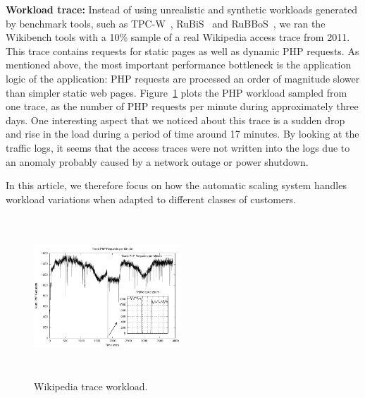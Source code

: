 

\textbf{Workload trace:}  Instead of using unrealistic and synthetic workloads generated by benchmark tools, such as TPC-W~\cite{TPC-W}, RuBiS~\cite{rubis} and RuBBoS~\cite{rubbos}, we ran the Wikibench tools with a 10\% sample of a real Wikipedia access trace from 2011.  This trace contains requests for static pages as well as dynamic PHP requests. As mentioned above, the most important performance bottleneck is the application logic of the application: PHP requests are processed an order of magnitude slower than simpler static web pages. Figure~\ref{workload} plots the PHP workload sampled from one trace, as the number of PHP requests per minute during approximately three days. One interesting aspect that we noticed about this trace is a sudden drop and rise in the load during a period of time around 17 minutes. By looking at the traffic logs, it seems that the access traces were not written into the logs due to an anomaly probably caused by a network outage or power shutdown. 


In this article, we therefore focus on how the automatic scaling system handles workload variations when adapted to different classes of customers. 


\begin{figure}
\begin{center}
\includegraphics[width=0.49\textwidth, height=6cm]{./images/traceWorkload_zoom}
\end{center}
\caption{Wikipedia trace workload.}
\label{workload}
\end{figure}




